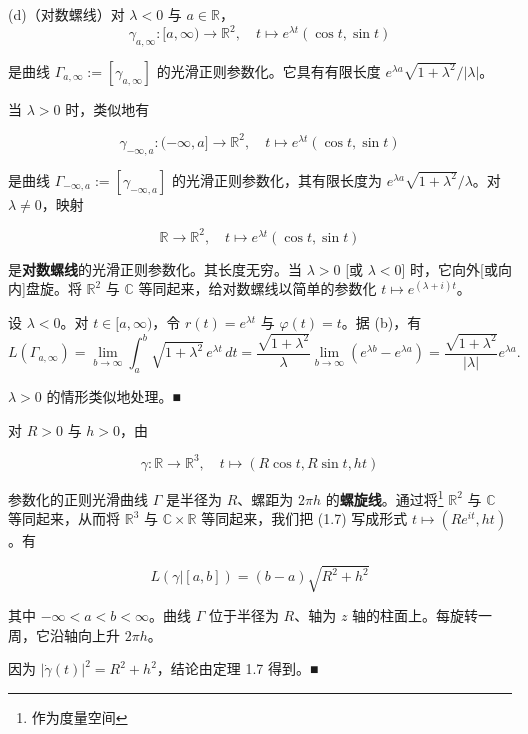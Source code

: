 \begin{example}
(d)（对数螺线）对 $ \lambda < 0 $ 与 $ a \in \mathbb{R} $，
\[
\gamma_{a,\infty} : [a,\infty) \to \mathbb{R}^{2} , \quad t \mapsto e^{\lambda t}(\cos t,\sin t)
\]

是曲线 $ \Gamma_{a,\infty} := [\gamma_{a,\infty}] $ 的光滑正则参数化。它具有有限长度 $ e^{\lambda a}\sqrt{1 + \lambda^{2}}/|\lambda| $。

当 $ \lambda > 0 $ 时，类似地有

\[
\gamma_{-\infty,a} : (-\infty,a] \to \mathbb{R}^{2} , \quad t \mapsto e^{\lambda t}(\cos t,\sin t)
\]

是曲线 $ \Gamma_{-\infty,a} := [\gamma_{-\infty,a}] $ 的光滑正则参数化，其有限长度为 $ e^{\lambda a}\sqrt{1 + \lambda^{2}}/\lambda $。对 $ \lambda \ne 0 $，映射

\[
\mathbb{R} \to \mathbb{R}^{2} , \quad t \mapsto e^{\lambda t}(\cos t,\sin t)
\]

是\textbf{对数螺线}的光滑正则参数化。其长度无穷。当 $ \lambda > 0 $ [或 $ \lambda < 0 $] 时，它向外[或向内]盘旋。将 $ \mathbb{R}^{2} $ 与 $ \mathbb{C} $ 等同起来，给对数螺线以简单的参数化 $ t \mapsto e^{(\lambda+i)t} $。

\proofhead
设 $ \lambda < 0 $。对 $ t \in [a,\infty) $，令 $ r(t) = e^{\lambda t} $ 与 $ \varphi(t) = t $。据 (b)，有
\[
L(\Gamma_{a,\infty}) = \lim_{b \to \infty}\int_a^b\sqrt{1 + \lambda^{2}}\,e^{\lambda t}\,dt = \frac{\sqrt{1 + \lambda^{2}}}{\lambda}\lim_{b \to \infty}(e^{\lambda b} - e^{\lambda a}) = \frac{\sqrt{1 + \lambda^{2}}}{|\lambda|}e^{\lambda a} .
\]

$ \lambda > 0 $ 的情形类似地处理。\nobreak\hspace{0.35em}■


\begin{items}
\item[（e）]

对 $ R > 0 $ 与 $ h > 0 $，由

\begin{equation}
\gamma : \mathbb{R} \to \mathbb{R}^{3} , \quad t \mapsto (R\cos t, R\sin t, ht)\tag{1.7}
\end{equation}

参数化的正则光滑曲线 $ \Gamma $ 是半径为 $ R $、螺距为 $ 2\pi h $ 的\textbf{螺旋线}。通过将\footnote{作为度量空间} $ \mathbb{R}^{2} $ 与 $ \mathbb{C} $ 等同起来，从而将 $ \mathbb{R}^{3} $ 与 $ \mathbb{C} \times \mathbb{R} $ 等同起来，我们把 (1.7) 写成形式 $ t \mapsto (Re^{it},ht) $。有

\[
L(\gamma|[a,b]) = (b - a)\sqrt{R^{2} + h^{2}}
\]

其中 $ -\infty < a < b < \infty $。曲线 $ \Gamma $ 位于半径为 $ R $、轴为 $ z $ 轴的柱面上。每旋转一周，它沿轴向上升 $ 2\pi h $。

\proofhead
因为 $ |\dot{\gamma}(t)|^{2} = R^{2} + h^{2} $，结论由定理 1.7 得到。\nobreak\hspace{0.35em}■
\end{items}

\end{example}

